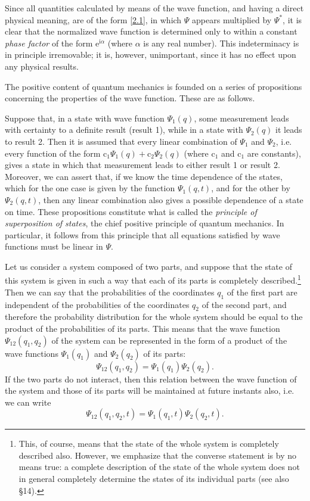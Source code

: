 Since all quantities calculated by means of the wave function, and having a direct physical meaning, are of the form \eqref{2.1}, in which $ \Psi $ appears multiplied by $ \Psi^* $, it is clear that the normalized wave function is determined only to within a constant \textit{phase factor} of the form $ \mathrm{e}^{\mathrm{i}\alpha} $ (where $ \alpha $ is any real number). This indeterminacy is in principle irremovable; it is, however, unimportant, since it has no effect upon any physical results.

The positive content of quantum mechanics is founded on a series of propositions concerning the properties of the wave function. These are as follows.

Suppose that, in a state with wave function $ \Psi_1(q) $, some measurement leads with certainty to a definite result (result 1), while in a state with $ \Psi_2(q) $ it leads to result 2. Then it is assumed that every linear combination of $ \Psi_1 $ and $ \Psi_2$, i.e. every function of the form $ \mathrm{c}_1\Psi_1(q)+\mathrm{c}_2\Psi_2(q) $ (where $ \mathrm{c}_1 $ and $ \mathrm{c}_1 $ are constants), gives a state in which that measurement leads to either result 1 or result 2. Moreover, we can assert that, if we know the time dependence of the states, which for the one case is given by the function $ \Psi_1(q,t) $, and for the other by $ \Psi_2(q,t) $, then any linear combination also gives a possible dependence of a state on time. These propositions constitute what is called the \textit{principle of superposition of states}, the chief positive principle of quantum mechanics. In particular, it follows from this principle that all equations satisfied by wave functions must be linear in $ \Psi $.

Let us consider a system composed of two parts, and suppose that the state of this system is given in such a way that each of its parts is completely described.\footnote{This, of course, means that the state of the whole system is completely described also. However, we emphasize that the converse statement is by no means true: a complete description of the state of the whole system does not in general completely determine the states of its individual parts (see also §14).
} Then we can say that the probabilities of the coordinates $ q_1 $ of the first part are independent of the probabilities of the coordinates $ q_2 $ of the second part, and therefore the probability distribution for the whole system should be equal to the product of the probabilities of its parts. This means that the wave function $ \Psi_{12}(q_1,q_2) $ of the system can be represented in the form of a product of the wave functions $ \Psi_1(q_1) $ and $ \Psi_2(q_2) $ of its parts:
\begin{equation}\label{2.3}
\Psi_{12}(q_1,q_2)=\Psi_1(q_1)\Psi_2(q_2).
\end{equation}
If the two parts do not interact, then this relation between the wave function of the system and those of its parts will be maintained at future instants also, i.e. we can write
\begin{equation}\label{2.4}
\Psi_{12}(q_1,q_2,t)=\Psi_1(q_1,t)\Psi_2(q_2,t).
\end{equation}
